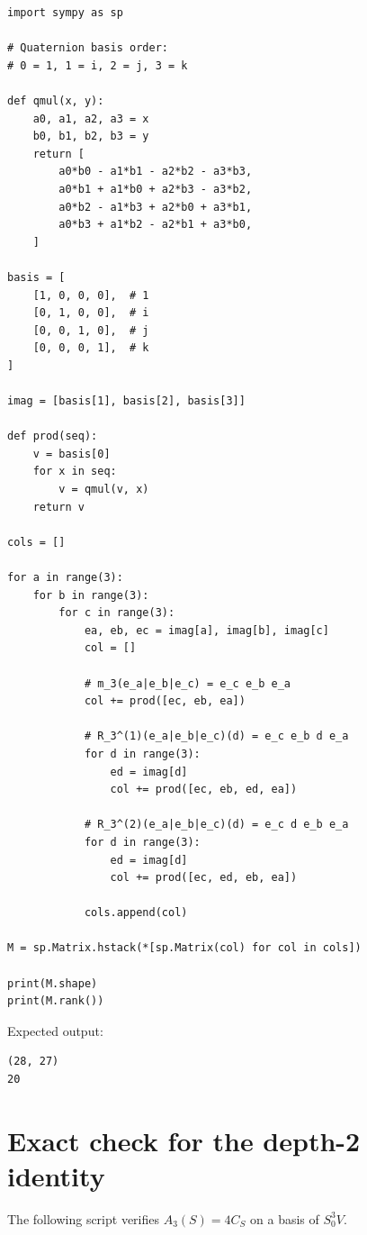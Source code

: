 \documentclass[11pt]{article}
\theoremstyle{definition}
\begin{document}
\begin{lstlisting}
import sympy as sp

# Quaternion basis order:
# 0 = 1, 1 = i, 2 = j, 3 = k

def qmul(x, y):
    a0, a1, a2, a3 = x
    b0, b1, b2, b3 = y
    return [
        a0*b0 - a1*b1 - a2*b2 - a3*b3,
        a0*b1 + a1*b0 + a2*b3 - a3*b2,
        a0*b2 - a1*b3 + a2*b0 + a3*b1,
        a0*b3 + a1*b2 - a2*b1 + a3*b0,
    ]

basis = [
    [1, 0, 0, 0],  # 1
    [0, 1, 0, 0],  # i
    [0, 0, 1, 0],  # j
    [0, 0, 0, 1],  # k
]

imag = [basis[1], basis[2], basis[3]]

def prod(seq):
    v = basis[0]
    for x in seq:
        v = qmul(v, x)
    return v

cols = []

for a in range(3):
    for b in range(3):
        for c in range(3):
            ea, eb, ec = imag[a], imag[b], imag[c]
            col = []

            # m_3(e_a|e_b|e_c) = e_c e_b e_a
            col += prod([ec, eb, ea])

            # R_3^(1)(e_a|e_b|e_c)(d) = e_c e_b d e_a
            for d in range(3):
                ed = imag[d]
                col += prod([ec, eb, ed, ea])

            # R_3^(2)(e_a|e_b|e_c)(d) = e_c d e_b e_a
            for d in range(3):
                ed = imag[d]
                col += prod([ec, ed, eb, ea])

            cols.append(col)

M = sp.Matrix.hstack(*[sp.Matrix(col) for col in cols])

print(M.shape)
print(M.rank())
\end{lstlisting}

Expected output:
\begin{lstlisting}
(28, 27)
20
\end{lstlisting}

\section{Exact check for the depth-2 identity}
\label{app:a3}

The following script verifies $A_3(S)=4C_S$ on a basis of $S^3_0V$.
\end{document}
